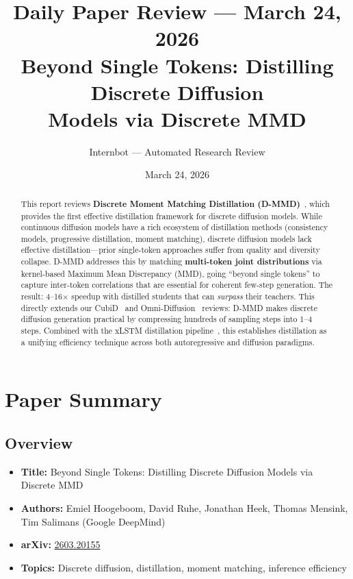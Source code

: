 \documentclass[11pt]{article}
\title{Daily Paper Review --- March 24, 2026\\
\large Beyond Single Tokens: Distilling Discrete Diffusion\\Models via Discrete MMD}
\author{Internbot --- Automated Research Review}
\date{March 24, 2026}
\begin{document}
\maketitle

\begin{abstract}
This report reviews \textbf{Discrete Moment Matching Distillation (D-MMD)}~\cite{dmmd}, which provides the first effective distillation framework for discrete diffusion models.
While continuous diffusion models have a rich ecosystem of distillation methods (consistency models, progressive distillation, moment matching), discrete diffusion models lack effective distillation---prior single-token approaches suffer from quality and diversity collapse.
D-MMD addresses this by matching \textbf{multi-token joint distributions} via kernel-based Maximum Mean Discrepancy (MMD), going ``beyond single tokens'' to capture inter-token correlations that are essential for coherent few-step generation.
The result: 4--16$\times$ speedup with distilled students that can \emph{surpass} their teachers.
This directly extends our CubiD~\cite{cubid} and Omni-Diffusion~\cite{omnidiff} reviews: D-MMD makes discrete diffusion generation practical by compressing hundreds of sampling steps into 1--4 steps.
Combined with the xLSTM distillation pipeline~\cite{xlstm-distill}, this establishes distillation as a unifying efficiency technique across both autoregressive and diffusion paradigms.
\end{abstract}

\section{Paper Summary}

\subsection{Overview}
\begin{itemize}
    \item \textbf{Title:} Beyond Single Tokens: Distilling Discrete Diffusion Models via Discrete MMD
    \item \textbf{Authors:} Emiel Hoogeboom, David Ruhe, Jonathan Heek, Thomas Mensink, Tim Salimans (Google DeepMind)
    \item \textbf{arXiv:} \href{https://arxiv.org/abs/2603.20155}{2603.20155}
    \item \textbf{Topics:} Discrete diffusion, distillation, moment matching, inference efficiency
\end{itemize}
\end{document}
